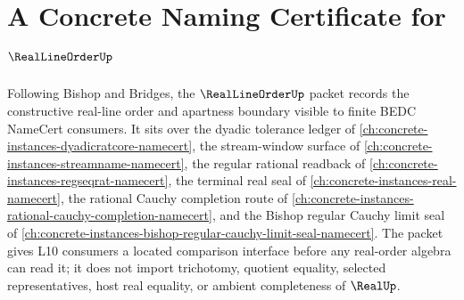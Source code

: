 \chapter{A Concrete Naming Certificate for $\RealLineOrderUp$}
\label{ch:concrete-instances-real-line-order-namecert}

Following Bishop and Bridges, the $\RealLineOrderUp$ packet records the constructive real-line order and apartness boundary visible to finite BEDC NameCert consumers. It sits over the dyadic tolerance ledger of \autoref{ch:concrete-instances-dyadicratcore-namecert}, the stream-window surface of \autoref{ch:concrete-instances-streamname-namecert}, the regular rational readback of \autoref{ch:concrete-instances-regseqrat-namecert}, the terminal real seal of \autoref{ch:concrete-instances-real-namecert}, the rational Cauchy completion route of \autoref{ch:concrete-instances-rational-cauchy-completion-namecert}, and the Bishop regular Cauchy limit seal of \autoref{ch:concrete-instances-bishop-regular-cauchy-limit-seal-namecert}. The packet gives L10 consumers a located comparison interface before any real-order algebra can read it; it does not import trichotomy, quotient equality, selected representatives, host real equality, or ambient completeness of $\RealUp$.

